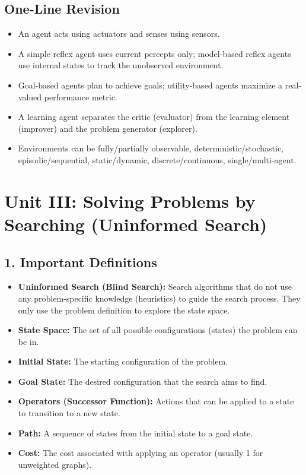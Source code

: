 \subsection{One-Line Revision}
\begin{itemize}
  \item   An agent acts using actuators and senses using sensors.
  \item   A simple reflex agent uses current percepts only; model-based reflex agents use internal states to track the unobserved environment.
  \item   Goal-based agents plan to achieve goals; utility-based agents maximize a real-valued performance metric.
  \item   A learning agent separates the critic (evaluator) from the learning element (improver) and the problem generator (explorer).
  \item   Environments can be fully/partially observable, deterministic/stochastic, episodic/sequential, static/dynamic, discrete/continuous, single/multi-agent.
\end{itemize}


\section{Unit III: Solving Problems by Searching (Uninformed Search)}

\subsection{1. Important Definitions}
\begin{itemize}
  \item   \textbf{Uninformed Search (Blind Search):} Search algorithms that do not use any problem-specific knowledge (heuristics) to guide the search process. They only use the problem definition to explore the state space.
  \item   \textbf{State Space:} The set of all possible configurations (states) the problem can be in.
  \item   \textbf{Initial State:} The starting configuration of the problem.
  \item   \textbf{Goal State:} The desired configuration that the search aims to find.
  \item   \textbf{Operators (Successor Function):} Actions that can be applied to a state to transition to a new state.
  \item   \textbf{Path:} A sequence of states from the initial state to a goal state.
  \item   \textbf{Cost:} The cost associated with applying an operator (usually 1 for unweighted graphs).
\end{itemize}

